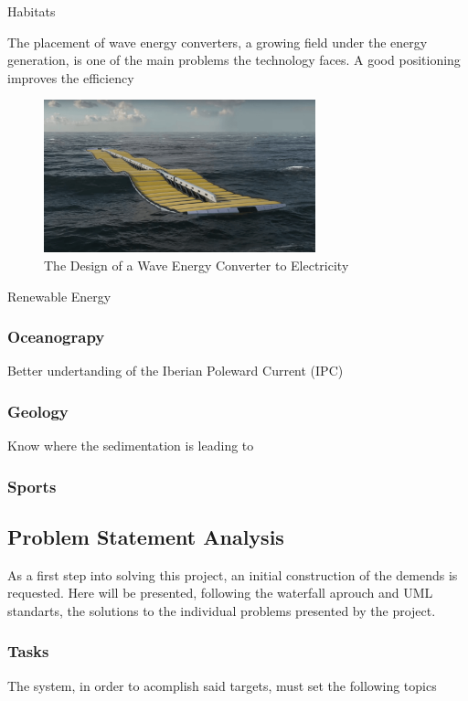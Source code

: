 Habitats 

The placement of wave energy converters, a growing field under the energy generation, is one of the main problems the
technology faces. A good positioning improves the efficiency
\begin{figure}
    \centering
    \includegraphics[width=0.7\textwidth]{images/chapter/introduction/renewable_energy.png}  %
    \caption{The Design of a Wave Energy Converter to Electricity}
    \label{fig:The Design of a Wave Energy Converter to Electricity}        
\end{figure}

Renewable Energy 

\subsubsection{Oceanograpy}
Better undertanding of the Iberian Poleward Current (IPC)

\subsubsection{Geology}

Know where the sedimentation is leading to
\subsubsection{Sports}

\subsection{Problem Statement Analysis}
As a first step into solving this project, an initial construction of the
demends is requested. Here will be presented, following the waterfall aprouch
and UML standarts, the solutions to the individual problems presented by the project.

\subsubsection{Tasks}
The system, in order to acomplish said targets, must set the following topics


